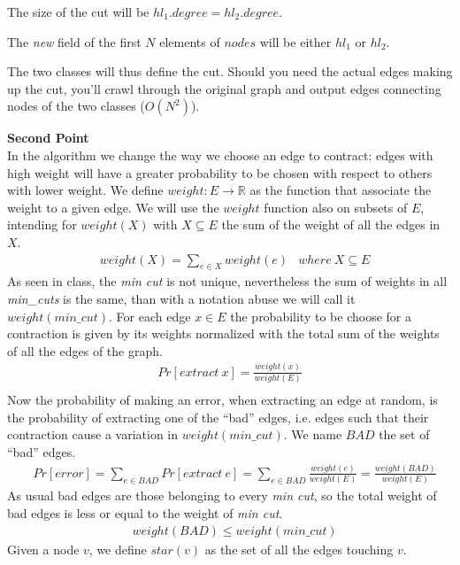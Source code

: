 \documentclass[a4paper]{article}
\begin{document}
The size of the cut will be $hl_1.degree = hl_2.degree$.

The \emph{new} field of the first $N$ elements of $nodes$ will be either $hl_1$ or $hl_2$. 

The two classes will thus define the cut. Should you need the actual edges making up the cut, you'll crawl through the original graph and output edges connecting nodes of the two classes ($O(N^2)$).

\break
\noindent
\textbf{Second Point}
\\

In the algorithm we change the way we choose an edge to contract: edges with high weight will have a greater probability to be chosen with respect to others with lower weight.
We define $weight: E \longrightarrow \mathbb{R}$ as the function that associate the weight to a given edge.
We will use the $weight$ function also on subsets of $E$, intending for $weight(X)$ with $X \subseteq E$ the sum of the weight of all the edges in $X$.
\begin{align*}
&weight(X) = \sum_{e \in X} weight(e) &where\ X \subseteq E
\end{align*}
As seen in class, the \textit{min cut} is not unique, nevertheless the sum of weights in all \textit{min\_cuts} is the same, than with a notation abuse we will call it $weight(min\_cut)$.
For each edge $x \in E$ the probability to be choose for a contraction is given by its weights normalized with the total sum of the weights of all the edges of the graph.
\begin{align*}
Pr[extract\ x] = \frac{weight(x)}{weight(E)}\\
\end{align*}
Now the probability of making an error, when extracting an edge at random, is the probability of extracting one of the ``bad'' edges, i.e. edges such that their contraction cause a variation in $weight(min\_cut)$.
We name $BAD$ the set of ``bad'' edges.
\begin{align*}
&Pr[error] = \sum_{e \in BAD} Pr[extract\ e] = \sum_{e \in BAD} \frac{weight(e)}{weight(E)} = \frac{weight(BAD)}{weight(E)} \tag{1}
\end{align*}
As usual bad edges are those belonging to every \textit{min cut}, so the total weight of bad edges is less or equal to the weight of \textit{min cut}.
\begin{align*}
&weight(BAD) \leq {weight(min\_cut)} \tag{2}
\end{align*}
Given a node $v$, we define $star(v)$ as the set of all the edges touching $v$.
\end{document}
